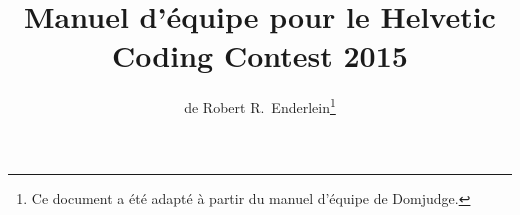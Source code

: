 
% 
%
%
\documentclass[11pt,a4paper]{article}
\usepackage{mathptmx}
\usepackage[in]{fullpage}
\usepackage[absolute]{textpos}
\usepackage{graphicx}
\usepackage[frenchb]{babel}
\usepackage[utf8]{inputenc}
\usepackage[T1]{fontenc}
\usepackage{fancyhdr}
\usepackage{moreverb}
\usepackage{color}
\usepackage{url}
\usepackage{longtable}
\pagestyle{fancy}


\renewcommand{\baselinestretch}{0.92}


\newcommand{\titleinfolong}{Manuel d'équipe pour le Helvetic Coding Contest 2015}
\newcommand{\titleinfo}{Manuel d'équipe}
\newcommand{\authorinfo}{Robert R.~Enderlein}
\newcommand{\langinfo}{Français}
\newcommand{\taskinfo}{Manuel}



\title{\titleinfolong}
\author{de \authorinfo\footnote{Ce document a été adapté à partir du manuel d'équipe de  Domjudge.}}
\date{}

\renewcommand{\headrulewidth}{0pt}
\renewcommand{\footrulewidth}{0.4pt}
\lhead{}
\chead{}
\rhead{}
\lfoot{\textcolor{gray}{Helvetic Coding Contest 2015}}
\cfoot{\thepage}
\rfoot{\textcolor{gray}{\titleinfo}}


\maketitle
\thispagestyle{fancy}
\setcounter{page}{1} 

